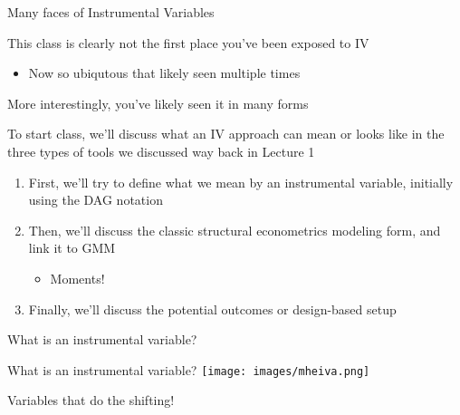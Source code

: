 \documentclass[notes,11pt, aspectratio=169]{beamer}
\newenvironment{wideitemize}{\itemize\addtolength{\itemsep}{10pt}}{\enditemize}
\begin{document}
\begin{frame}{Many faces of Instrumental Variables}
  \begin{wideitemize}
  \item  This class is clearly not the first place you've been exposed to IV
    \begin{itemize}
    \item Now so ubiqutous that likely seen multiple times
    \end{itemize}
  \item More interestingly, you've likely seen it in many forms
  \item To start class, we'll discuss what an IV approach can mean or
    looks like in the three types of tools we discussed way back in
    Lecture 1
    \begin{enumerate}
  \item First, we'll try to define what we mean by an instrumental
    variable, initially using the DAG notation
  \item Then, we'll discuss the classic structural econometrics
    modeling form, and link it to GMM
    \begin{itemize}
    \item Moments!
    \end{itemize}
  \item Finally, we'll discuss the potential outcomes or design-based
    setup
    \end{enumerate}
  \end{wideitemize}
\end{frame}

\begin{frame}{What is an instrumental variable?}
\end{frame}

\begin{frame}{What is an instrumental variable?}
  \texttt{[image: images/mheiva.png]}
\begin{wideitemize}
  \item Variables that do the shifting!
\end{wideitemize}
\end{frame}
\end{document}
